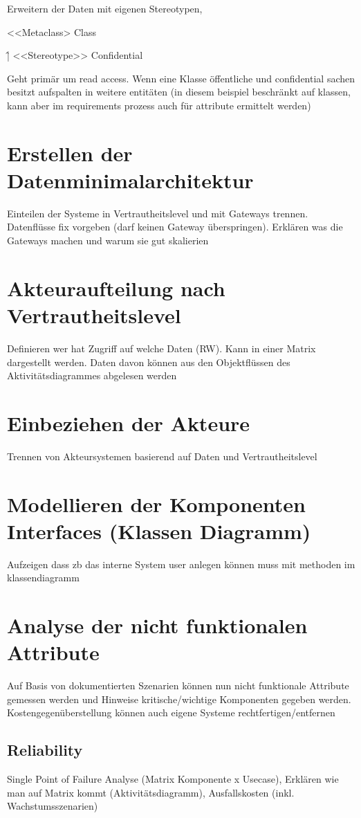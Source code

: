 Erweitern der Daten mit eigenen Stereotypen,

<<Metaclass>
Class

\^
|
<<Stereotype>>
Confidential

Geht primär um read access. Wenn eine Klasse öffentliche und confidential sachen besitzt aufspalten in weitere entitäten (in diesem beispiel beschränkt auf klassen, kann aber im requirements prozess auch für attribute ermittelt werden)

\section{Erstellen der Datenminimalarchitektur}
Einteilen der Systeme in Vertrautheitslevel und mit Gateways trennen. Datenflüsse fix vorgeben (darf keinen Gateway überspringen). Erklären was die Gateways machen und warum sie gut skalierien


\section{Akteuraufteilung nach Vertrautheitslevel}
Definieren wer hat Zugriff auf welche Daten (RW). Kann in einer Matrix dargestellt werden. Daten davon können aus den Objektflüssen des Aktivitätsdiagrammes abgelesen werden


\section{Einbeziehen der Akteure}
Trennen von Akteursystemen basierend auf Daten und Vertrautheitslevel

\section{Modellieren der Komponenten Interfaces (Klassen Diagramm)}
Aufzeigen dass zb das interne System user anlegen können muss mit methoden im klassendiagramm

\section{Analyse der nicht funktionalen Attribute}
Auf Basis von dokumentierten Szenarien können nun nicht funktionale Attribute gemessen werden und Hinweise kritische/wichtige Komponenten gegeben werden. Kostengegenüberstellung können auch eigene Systeme rechtfertigen/entfernen

\subsection{Reliability}
Single Point of Failure Analyse (Matrix Komponente x Usecase), Erklären wie man auf Matrix kommt (Aktivitätsdiagramm), Ausfallskosten (inkl. Wachstumsszenarien)


